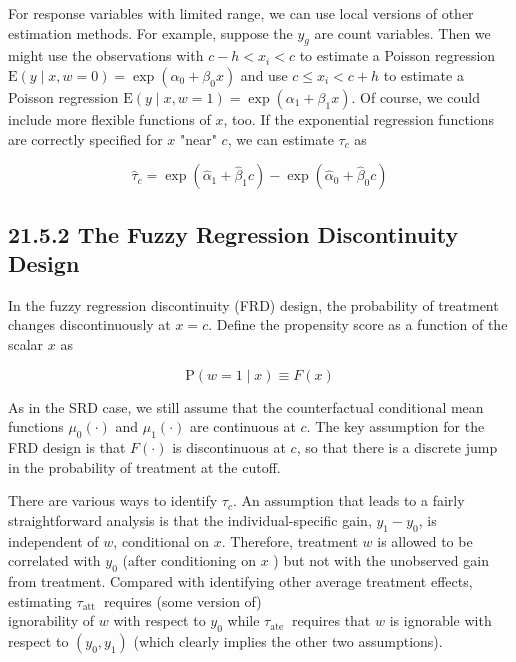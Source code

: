 \documentclass[10pt]{article}
\begin{document}
For response variables with limited range, we can use local versions of other estimation methods. For example, suppose the $y_{g}$ are count variables. Then we might use the observations with $c-h<x_{i}<c$ to estimate a Poisson regression $\mathrm{E}(y \mid x, w=0)=\exp \left(\alpha_{0}+\beta_{0} x\right)$ and use $c \leq x_{i}<c+h$ to estimate a Poisson regression $\mathrm{E}(y \mid x, w=1)=\exp \left(\alpha_{1}+\beta_{1} x\right)$. Of course, we could include more flexible functions of $x$, too. If the exponential regression functions are correctly specified for $x$ "near" $c$, we can estimate $\tau_{c}$ as


\begin{equation*}
\hat{\tau}_{c}=\exp \left(\hat{\alpha}_{1}+\hat{\beta}_{1} c\right)-\exp \left(\hat{\alpha}_{0}+\hat{\beta}_{0} c\right) \tag{21.104}
\end{equation*}


\subsection*{21.5.2 The Fuzzy Regression Discontinuity Design}
In the fuzzy regression discontinuity (FRD) design, the probability of treatment changes discontinuously at $x=c$. Define the propensity score as a function of the scalar $x$ as


\begin{equation*}
\mathrm{P}(w=1 \mid x) \equiv F(x) \tag{21.105}
\end{equation*}


As in the SRD case, we still assume that the counterfactual conditional mean functions $\mu_{0}(\cdot)$ and $\mu_{1}(\cdot)$ are continuous at $c$. The key assumption for the FRD design is that $F(\cdot)$ is discontinuous at $c$, so that there is a discrete jump in the probability of treatment at the cutoff.

There are various ways to identify $\tau_{c}$. An assumption that leads to a fairly straightforward analysis is that the individual-specific gain, $y_{1}-y_{0}$, is independent of $w$, conditional on $x$. Therefore, treatment $w$ is allowed to be correlated with $y_{0}$ (after conditioning on $x$ ) but not with the unobserved gain from treatment. Compared with identifying other average treatment effects, estimating $\tau_{\text {att }}$ requires (some version of)\\
ignorability of $w$ with respect to $y_{0}$ while $\tau_{\text {ate }}$ requires that $w$ is ignorable with respect to $\left(y_{0}, y_{1}\right)$ (which clearly implies the other two assumptions).
\end{document}
